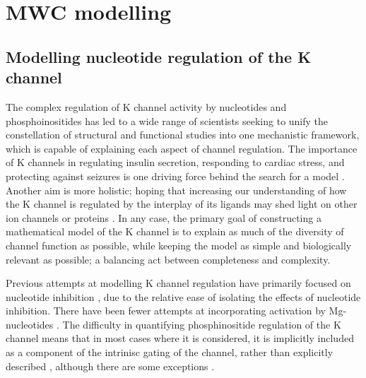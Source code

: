 \chapter{\label{ch:4}MWC modelling} 

\graphicspath{{figures/ch4/}}

\minitoc

\section{Modelling nucleotide regulation of the K\ATP{} channel}

The complex regulation of K\ATP{} channel activity by nucleotides and phosphoinositides has led to a wide range of scientists seeking to unify the constellation of structural and functional studies into one mechanistic framework, which is capable of explaining each aspect of channel regulation.
The importance of K\ATP{} channels in regulating insulin secretion, responding to cardiac stress, and protecting against seizures is one driving force behind the search for a model \cite{proks_modeling_2009}.
Another aim is more holistic; hoping that increasing our understanding of how the K\ATP{} channel is regulated by the interplay of its ligands may shed light on other ion channels or proteins \cite{garfinkel_modeling_2017}.
In any case, the primary goal of constructing a mathematical model of the K\ATP{} channel is to explain as much of the diversity of channel function as possible, while keeping the model as simple and biologically relevant as possible; a balancing act between completeness and complexity.

Previous attempts at modelling K\ATP{} channel regulation have primarily focused on nucleotide inhibition \cite{trapp_molecular_1998, enkvetchakul_kinetic_2000, markworth_atp4-_2000, ribalet_regulation_2000, enkvetchakul_atp_2001-1, drain_concerted_2004, proks_gating_2005, li_ligand-dependent_2005, ribalet_atp-sensitive_2006-1, craig_how_2008-1}, due to the relative ease of isolating the effects of nucleotide inhibition.
There have been fewer attempts at incorporating activation by Mg-nucleotides \cite{ribalet_regulation_2000, proks_activation_2010-1, vedovato_nucleotide-binding_2015}.
The difficulty in quantifying phosphinositide regulation of the K\ATP{} channel means that in most cases where it is considered, it is implicitly included as a component of the intrinisc gating of the channel, rather than explicitly described \cite{baukrowitz_pip2_1998, fan_phosphoinositides_1999, enkvetchakul_kinetic_2000}, although there are some exceptions \cite{ribalet_regulation_2000, enkvetchakul_atp_2001-1, enkvetchakul_gating_2003}.

